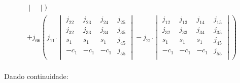 \begin{equation}
\begin{gathered}
\begin{vmatrix}
    \end{vmatrix}) \\
    + j_{66}(j_{11}.\begin{vmatrix}
        j_{22} & j_{23} & j_{24} & j_{25} \\
        j_{32} & j_{33} & j_{34} & j_{35} \\
          s_1  &   s_1  &   s_1  & j_{45} \\
         -c_1  &  -c_1  &  -c_1  & j_{55} \\        
    \end{vmatrix} - j_{21}.\begin{vmatrix}
        j_{12} & j_{13} & j_{14} & j_{15} \\
        j_{32} & j_{33} & j_{34} & j_{35} \\
          s_1  &   s_1  &   s_1  & j_{45} \\
         -c_1  &  -c_1  &  -c_1  & j_{55} \\               
    \end{vmatrix}) \\
\end{gathered}    
\end{equation}

Dando continuidade:

